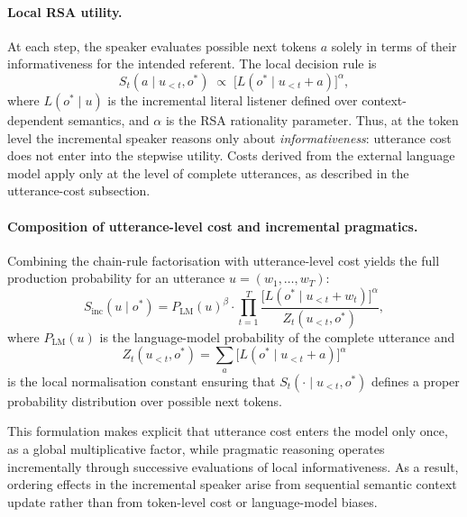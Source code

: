 \documentclass[11pt, a4paper]{article}
\begin{document}
\paragraph{Local RSA utility.}
At each step, the speaker evaluates possible next tokens $a$ solely in terms of their informativeness for the intended referent.
The local decision rule is
\begin{equation}
  S_t(a \mid u_{<t}, o^\ast)
  \;\propto\;
  \bigl[L(o^\ast \mid u_{<t} + a)\bigr]^{\alpha},
  \label{eq:inc_speaker}
\end{equation}
where $L(o^\ast \mid u)$ is the incremental literal listener defined over context-dependent semantics, and $\alpha$ is the RSA rationality parameter.
Thus, at the token level the incremental speaker reasons only about \emph{informativeness}: utterance cost does not enter into the stepwise utility.
Costs derived from the external language model apply only at the level of complete utterances, as described in the utterance-cost subsection.

\paragraph{Composition of utterance-level cost and incremental pragmatics.}
Combining the chain-rule factorisation with utterance-level cost yields the full production probability for an utterance $u = (w_1,\ldots,w_T)$:
\begin{equation}
  S_{\mathrm{inc}}(u \mid o^\ast)
  = P_{\mathrm{LM}}(u)^{\beta}
  \cdot \prod_{t=1}^{T}
  \frac{\bigl[L(o^\ast \mid u_{<t} + w_t)\bigr]^{\alpha}}{Z_t(u_{<t}, o^\ast)},
  \label{eq:inc_full}
\end{equation}
where $P_{\mathrm{LM}}(u)$ is the language-model probability of the complete utterance and
\begin{equation}
  Z_t(u_{<t}, o^\ast)
  = \sum_{a} \bigl[L(o^\ast \mid u_{<t} + a)\bigr]^{\alpha}
  \label{eq:inc_normaliser}
\end{equation}
is the local normalisation constant ensuring that $S_t(\cdot \mid u_{<t}, o^\ast)$ defines a proper probability distribution over possible next tokens.

This formulation makes explicit that utterance cost enters the model only once, as a global multiplicative factor, while pragmatic reasoning operates incrementally through successive evaluations of local informativeness.
As a result, ordering effects in the incremental speaker arise from sequential semantic context update rather than from token-level cost or language-model biases.
\end{document}
